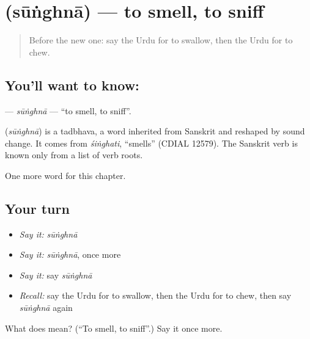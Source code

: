 \section[\texorpdfstring{\ur{سونگھنا} (sūṅghnā)}{سونگھنا (sūṅghnā)}]{ (sūṅghnā) — to smell, to sniff}

\label{lesson:UR-C239-sunghna}



\begin{quote}
Before the new one: say the Urdu for to swallow, then the Urdu for to chew.
\end{quote}

\subsection*{You'll want to know: }
\textbf{} — \emph{sūṅghnā} — \textquotedblleft{}to smell, to sniff\textquotedblright{}.

\begin{cousinweb}
\textbf{} (\emph{sūṅghnā}) is a tadbhava, a word inherited from Sanskrit and reshaped by sound change. It comes from \emph{śiṅghati}, \textquotedblleft{}smells\textquotedblright{} (CDIAL 12579). The Sanskrit verb is known only from a list of verb roots.
\end{cousinweb}

\begin{grammarlens}[title={What you've built}]
One more word for this chapter.
\end{grammarlens}

\subsection*{Your turn}
\begin{itemize}
\raggedright
  \item \emph{Say it:} \emph{sūṅghnā}
  \item \emph{Say it:} \emph{sūṅghnā}, once more
  \item \emph{Say it:} say \emph{sūṅghnā}
  \item \emph{Recall:} say the Urdu for to swallow, then the Urdu for to chew, then say \emph{sūṅghnā} again
\end{itemize}

\begin{tcolorbox}[breakable,colback=teal!4,colframe=teal!35!black,title={Before you move on}]
What does  mean? (\textquotedblleft{}To smell, to sniff\textquotedblright{}.) Say it once more.
\end{tcolorbox}
